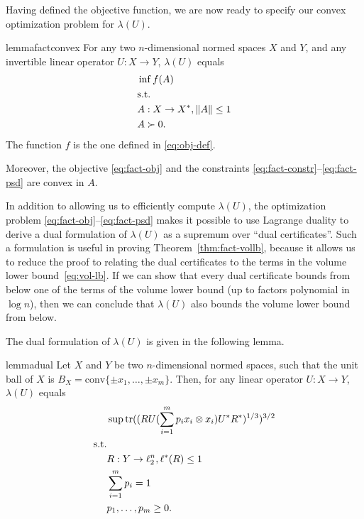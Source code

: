\documentclass[11pt]{article}
\DeclareMathOperator{\tr}{tr}
\begin{document}
Having defined the objective function, we are now ready to specify our
convex optimization problem for $\lambda(U)$.
\begin{restatable}{lemma}{factconvex}
  \label{lm:fact-convex}
  For any two $n$-dimensional normed spaces $X$ and $Y$, and any
  invertible linear operator $U:X \to Y$, $\lambda(U)$ equals
  \begin{align}
    &\inf  f(A)  \label{eq:fact-obj}\\
    &\text{s.t.}\notag\\
    &A: X \to X^*,\|A\| \le 1\label{eq:fact-constr}\\
    &A \succ 0.\label{eq:fact-psd}
  \end{align}
  The function $f$ is the one defined in \eqref{eq:obj-def}.

  Moreover, the objective \eqref{eq:fact-obj} and the constraints
  \eqref{eq:fact-constr}--\eqref{eq:fact-psd} are convex in $A$.
\end{restatable}

In addition to allowing us to efficiently compute $\lambda(U)$, the
optimization problem \eqref{eq:fact-obj}--\eqref{eq:fact-psd} makes it
possible to use Lagrange duality to derive a dual formulation of
$\lambda(U)$ as a supremum over ``dual certificates''. Such a
formulation is useful in proving Theorem~\ref{thm:fact-vollb}, because
it allows us to reduce the proof to relating the dual certificates
to the terms in the volume lower bound~\eqref{eq:vol-lb}. If we can
show that every dual certificate bounds from below one of the terms of
the volume lower bound (up to factors polynomial in $\log n$), then we
can conclude that $\lambda(U)$ also bounds the volume lower bound from
below.

The dual formulation of $\lambda(U)$ is given in the following lemma. 
\begin{restatable}{lemma}{dual}
  \label{lm:dual}
  Let $X$ and $Y$ be two $n$-dimensional normed spaces, such that the
  unit ball of $X$ is $B_X = \mathrm{conv}\{\pm x_1, \ldots, \pm
  x_m\}$. Then, for any linear operator $U:X \to Y$, $\lambda(U)$
  equals
  \begin{align}
    &\sup \tr((RU(\sum_{i = 1}^m{p_i x_i \otimes  x_i})U^*R^*)^{1/3})^{3/2}\label{eq:dual-obj}\\
    \text{s.t.}\notag\\
    &R: Y \to \ell_2^n, \ell^*(R) \le 1 \label{eq:dual-ellstar}\\
    &\sum_{i = 1}^m{p_i} = 1\label{eq:dual-prob}\\
    &p_1, \ldots, p_m \ge 0. \label{eq:dual-nonneg}
  \end{align}
\end{restatable}
\end{document}

